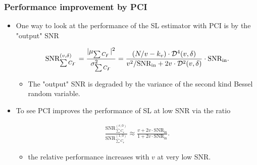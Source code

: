 \begin{frame}
  \frametitle{Performance improvement by PCI}

    \begin{itemize}

      \item One way to look at the performance of the SL estimator with PCI is by the "output" SNR
      
      \begin{equation}
        \begin{aligned}
          \label{eq:SNR_out}
          \text{SNR}_{\sum C_{\digamma}}^{(v,\delta)}=\frac{|\mu_{\sum C_{\digamma}}|^2}{\sigma^2_{\sum C_{\digamma}}} 
          =\frac{(N/v-k_v)\cdot\mathcal{D}^4(v,\delta)}
          {v^2/\text{SNR}_{\text{in}}+2v\cdot\mathcal{D}^2(v,\delta)}\cdot\text{SNR}_{\text{in}}. \\
        \end{aligned}
      \end{equation}
    
      \begin{itemize}
        \item The "output" SNR is degraded by the variance of the second kind Bessel random variable.
      \end{itemize}

      \item To see PCI improves the performance of SL at low SNR via the ratio
      
      \begin{equation}
        \begin{aligned}
          \label{eq:relative_processing_gain}
          \frac{\text{SNR}_{\sum C_{\digamma}}^{(v,0)}}{\text{SNR}_{\sum C_{\digamma}}^{(1,0)}}
          \approx\frac{v+2v\cdot\text{SNR}_{\text{in}}}{1+2v\cdot\text{SNR}_{\text{in}}}.
        \end{aligned}
      \end{equation}

      \begin{itemize}
        \item the relative performance increases with $v$ at very low SNR.
      \end{itemize}

    \end{itemize}



\end{frame}


